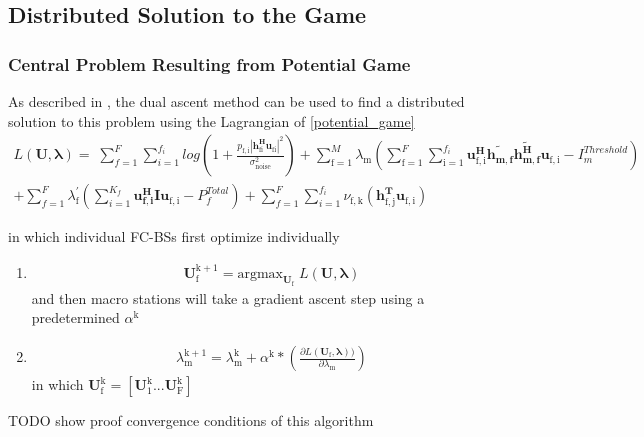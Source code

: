 \documentclass[12pt]{article}
\begin{document}
\subsection{Distributed Solution to the Game}
\subsubsection{Central Problem Resulting from Potential Game}
As described in \cite[p.~8,9]{boyd2011distributed}, the dual ascent method can be used to find a distributed solution to this problem using the Lagrangian of \eqref{potential_game}
\\
\begin{multline}
L(\mathbf{U,\lambda}) = 
\;
\sum_{f=1}^F
\sum_{i=1}^{f_i}
log(1+\frac{p_{ \mathrm{f,i}}|\mathbf{h^H_{\mathrm{fi}}u_{ \mathrm{fi}}}|^2}{\sigma^2_{ \mathrm{noise}} })
+
\sum_{\mathrm{f=1}}^M \lambda_{\mathrm{m}}
(\sum_{\mathrm{f=1}}^F
\sum_{\mathrm{i=1}}^{f_i}
\mathbf{u_{ \mathrm{f,i}}^H} \mathbf{\tilde{h_{m,f}}} \mathbf{\tilde{h_{m,f}^H}} \mathbf{u_{\mathrm{f,i}}} - I^{Threshold}_{m} )
\\
+ 
\sum_{f=1}^F
\lambda_{\mathrm{f}}^{'}(
\sum_{i=1}^{K_f}\mathbf{u_{f,i}^H} \mathbf{I} \mathbf{u_{\mathrm{f,i}}} -  P^{Total}_{f})
+
\sum_{f=1}^F
\sum_{i=1}^{f_i}
\nu_{\mathrm{f,k}}(\mathbf{h^T_{\mathrm{f,j}}}\mathbf{u_{\mathrm{f,i}}})
\end{multline}

in which individual FC-BSs first optimize individually
\begin{enumerate}
\item 
\begin{gather}
\mathbf{U^{\mathrm{k+1}}_{\mathrm{f}}} =\mathrm{argmax}_{\mathbf{U_{\mathrm{f}}}} \; L(\mathbf{U,\lambda})
\end{gather}
and then macro stations will take a gradient ascent step using a 
predetermined $\alpha^{\mathrm{k}}$
\item 
\begin{gather}
\lambda_{\mathrm{m}}^{\mathrm{k+1}} = 
\lambda_{\mathrm{m}}^{\mathrm{k}}
+
\alpha^{\mathrm{k}}*
(\frac{\partial L(\mathbf{\mathbf{U_{\mathrm{f}}},\lambda}) )}{\partial\lambda_{\mathrm{m}}})
\end{gather}
in which $\mathbf{U^{\mathrm{k}}_{\mathrm{f}}} = [\mathbf{U^{\mathrm{k}}_{\mathrm{1}}}...\mathbf{U^{\mathrm{k}}_{\mathrm{F}}}]$

\end{enumerate} 

TODO show proof convergence conditions of this algorithm
\newpage

\end{document}
